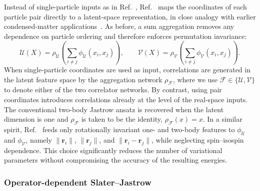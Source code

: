 Instead of single-particle inputs as in Ref.~\cite{adams_sensitivity_2021}, Ref.~\cite{gnech_calculation_2020} maps the coordinates of each particle pair directly to a latent-space representation, in close analogy with earlier condensed-matter applications~\cite{pfau_ab_2020,hermann_deep-neural-network_2020}. As before, a sum aggregation removes any dependence on particle ordering and therefore enforces permutation invariance:
\begin{equation}
\mathcal{U}(X)
= \rho_{\mathcal U}\!\left(\sum_{i \neq j}
\phi_{\mathcal U}(x_i, x_j)\right),
\qquad
\mathcal{V}(X)
= \rho_{\mathcal V}\!\left(\sum_{i \neq j}
\phi_{\mathcal V}(x_i, x_j)\right).
\label{eq:deep_sets_pair}
\end{equation}
When single-particle coordinates are used as input, correlations are generated
in the latent feature space by the aggregation network $\rho_{\mathcal F}$, where we use $\mathcal{F}\in\{\mathcal{U},\mathcal{V}\}$ to
denote either of the two correlator networks. By
contrast, using pair coordinates introduces correlations already at the level of
the real-space inputs. The conventional two-body Jastrow ansatz is recovered
when the latent dimension is one and $\rho_{\mathcal F}$ is taken to be the
identity, $\rho_{\mathcal F}(x)=x$.
In a similar spirit, Ref.~\cite{yang_consistent_2022} feeds only rotationally
invariant one- and two-body features to $\phi_{\mathcal U}$ and
$\phi_{\mathcal V}$, namely $ \|\mathbf r_i \|$, $ \|\mathbf r_j \|$, and
$\| \mathbf r_i-\mathbf r_j \|$, while neglecting spin--isospin dependence. This
choice significantly reduces the number of variational parameters without
compromising the accuracy of the resulting energies.

\subsubsection{Operator-dependent Slater--Jastrow}
\label{sec:chiral_ansatz}

